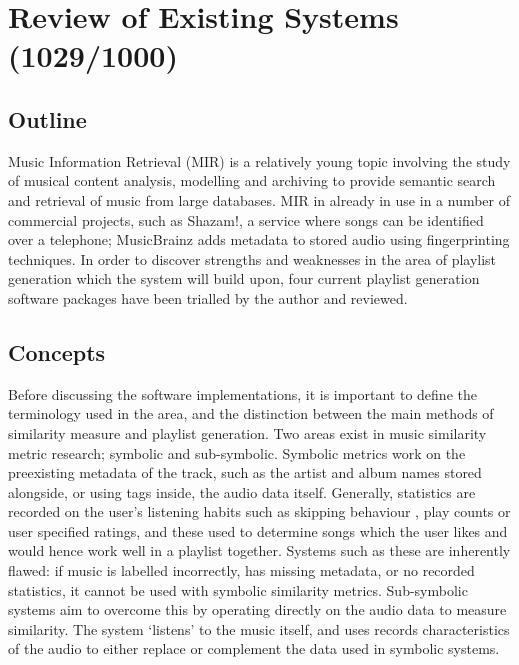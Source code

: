 \chapter{Review of Existing Systems (1029/1000)}
\section{Outline}
Music Information Retrieval (MIR) is a relatively young topic involving the study of musical content analysis, modelling and archiving to provide semantic search and retrieval of music from large databases. MIR in already in use in a number of commercial projects, such as Shazam!, a service where songs can be identified over a telephone; MusicBrainz adds metadata to stored audio using fingerprinting techniques. In order to discover strengths and weaknesses in the area of playlist generation which the system will build upon, four current playlist generation software packages have been trialled by the author and reviewed.
\section{Concepts}
Before discussing the software implementations, it is important to define the terminology used in the area, and the distinction between the main methods of similarity measure and playlist generation. Two areas exist in music similarity metric research; symbolic and sub-symbolic. Symbolic metrics work on the preexisting metadata of the track, such as the artist and album names stored alongside, or using  tags inside, the audio data itself. Generally, statistics are recorded on the user's listening habits such as skipping behaviour \citep{Pampalk2005a}, play counts or user specified ratings, and these used to determine songs which the user likes and would hence work well in a playlist together. Systems such as these are inherently flawed: if music is labelled incorrectly, has missing metadata, or no recorded statistics, it cannot be used with symbolic similarity metrics. Sub-symbolic systems aim to overcome this by operating directly on the audio data to measure similarity. The system `listens' to the music itself, and uses records characteristics of the audio to either replace or complement the data used in symbolic systems.

